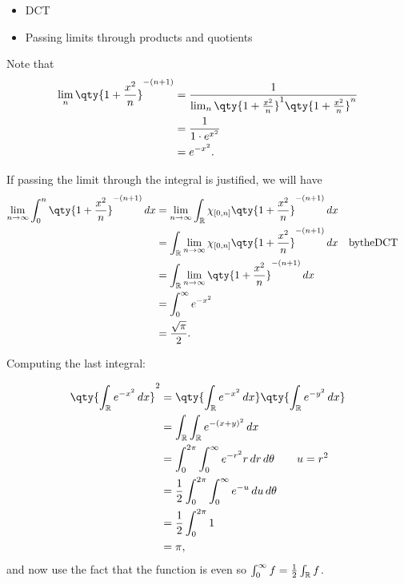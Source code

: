 
\begin{solution}

\hfill

\begin{concept}

\hfill

\begin{itemize}
\tightlist
\item
  DCT
\item
  Passing limits through products and quotients
\end{itemize}

\end{concept}

Note that
\begin{align*}
\lim_{n} \qty{1 + {x^2 \over n}}^{-(n+1)} 
&= {1 \over \lim_{n} \qty{1 + {x^2 \over n}}^1 \qty{1 + {x^2 \over n}}^n } \\
&= {1 \over 1 \cdot e^{x^2}} \\
&= e^{-x^2}
.\end{align*}

If passing the limit through the integral is justified, we will have
\begin{align*}
\lim_{n\to\infty} \int_0^n \qty{ 1 + {x^2\over n}}^{-(n+1)}\, dx 
&= \lim_{n\to\infty} \int_{\mathbb{R}}\chi_{[0, n]} \qty{ 1 + {x^2\over n}}^{-(n+1)} \, dx  \\
&= \int_{\mathbb{R}}\lim_{n\to\infty} \chi_{[0, n]} \qty{ 1 + {x^2\over n}}^{-(n+1)} \, dx  {\quad \operatorname{by the DCT} \quad} \\
&= \int_{\mathbb{R}}\lim_{n\to\infty} \qty{ 1 + {x^2\over n}}^{-(n+1)} \, dx  \\
&= \int_0^\infty e^{-x^2}  \\
&= {\sqrt \pi \over 2}
.\end{align*}

Computing the last integral:

\begin{align*}
\qty{\int_{\mathbb{R}}e^{-x^2}\, dx}^2
&= \qty{\int_{\mathbb{R}}e^{-x^2}\,dx} \qty{\int_{\mathbb{R}}e^{-y^2}\,dx} \\
&= \int_{\mathbb{R}}\int_{\mathbb{R}}e^{-(x+y)^2}\, dx \\
&= \int_0^{2\pi} \int_0^\infty e^{-r^2} r\, dr \, d\theta \qquad u=r^2 \\
&= {1\over 2} \int_0^{2\pi } \int_0^\infty e^{-u}\, du \, d\theta \\
&= {1\over 2} \int_0^{2\pi} 1 \\
&= \pi
,\end{align*}
and now use the fact that the function is even so
\(\int_0^\infty f = {1\over 2} \int_{\mathbb{R}}f\).


\end{solution}

